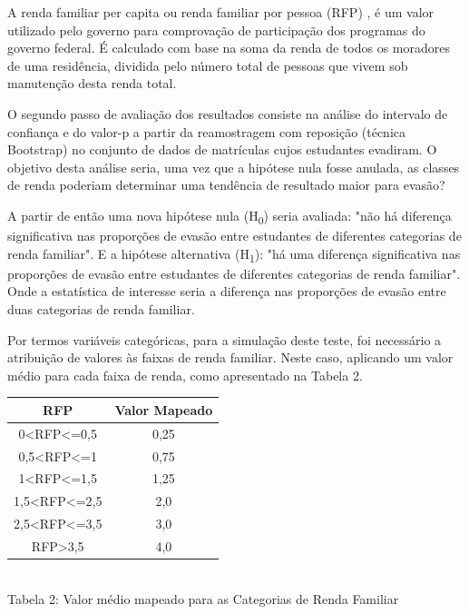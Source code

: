 \documentclass[conference]{IEEEtran}
\begin{document}
A renda familiar per capita ou renda familiar por pessoa (RFP) \cite{franz2024}, é um valor utilizado pelo governo para comprovação de participação dos programas do governo federal. É calculado com base na soma da renda de todos os moradores de uma residência, dividida pelo número total de pessoas que vivem sob manutenção desta renda total.\par
O segundo passo de avaliação dos resultados consiste na análise do intervalo de confiança e do valor-p a partir da reamostragem com reposição (técnica Bootstrap) no conjunto de dados de matrículas cujos estudantes evadiram. O objetivo desta análise seria, uma vez que a hipótese nula fosse anulada, as classes de renda poderiam determinar uma tendência de resultado maior para evasão?\par
A partir de então uma nova hipótese nula (H\textsubscript{0}) seria avaliada: "não há diferença significativa nas proporções de evasão entre estudantes de diferentes categorias de renda familiar". E a hipótese alternativa (H\textsubscript{1}): "há uma diferença significativa nas proporções de evasão entre estudantes de diferentes categorias de renda familiar". Onde a estatística de interesse seria a diferença nas proporções de evasão entre duas categorias de renda familiar.\par
Por termos variáveis categóricas, para a simulação deste teste, foi necessário a atribuição de valores às faixas de renda familiar. Neste caso, aplicando um valor médio para cada faixa de renda, como apresentado na Tabela 2.

\begin{center}
    \begin{tabular}{ |c|c| } 
        \hline
        \textbf{RFP} & \textbf{Valor Mapeado} \\
        \hline
        0<RFP<=0,5 & 0,25 \\
        \hline
        0,5<RFP<=1 & 0,75 \\
        \hline
        1<RFP<=1,5 & 1,25 \\
        \hline
        1,5<RFP<=2,5 & 2,0 \\
        \hline
        2,5<RFP<=3,5 & 3,0 \\
        \hline
        RFP>3,5 & 4,0 \\
        \hline
    \end{tabular} \\
    Tabela 2: Valor médio mapeado para as Categorias de Renda Familiar
\end{center}
\end{document}
